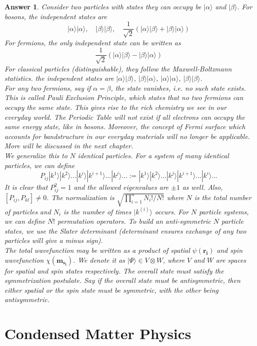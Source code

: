 \documentclass[a4paper]{article}
\newtheorem{ans}{Answer}[section]
\theoremstyle{new}
\begin{document}
\begin{ans}
Consider two particles with states they can occupy be $|\alpha\rangle$ and $|\beta\rangle$. For bosons, the independent states are
$$|\alpha\rangle|\alpha\rangle,\quad|\beta\rangle|\beta\rangle,\quad\frac{1}{\sqrt{2}}(|\alpha\rangle|\beta\rangle+|\beta\rangle|\alpha\rangle)$$
For fermions, the only independent state can be written as
$$\frac{1}{\sqrt{2}}(|\alpha\rangle|\beta\rangle-|\beta\rangle|\alpha\rangle)$$
For classical particles (distinguishable), they follow the Maxwell-Boltzmann statistics. the independent states are $|\alpha\rangle|\beta\rangle$, $|\beta\rangle|\alpha\rangle$, $|\alpha\rangle|\alpha\rangle$, $|\beta\rangle|\beta\rangle$.\\[5pt]
For any two fermions, say if $\alpha=\beta$, the state vanishes, i.e. no such state exists. This is called Pauli Exclusion Principle, which states that no two fermions can occupy the same state. This gives rise to the rich chemistry we see in our everyday world. The Periodic Table will not exist if all electrons can occupy the same energy state, like in bosons. Moreover, the concept of Fermi surface which accounts for bandstructure in our everyday materials will no longer be applicable. More will be discussed in the next chapter.\\[5pt]
We generalize this to $N$ identical particles. For a system of many identical particles, we can define
$$P_{ij}|k^1\rangle|k^2\rangle...|k^i\rangle|k^{i+1}\rangle...|k^j\rangle...:=|k^1\rangle|k^2\rangle...|k^j\rangle|k^{i+1}\rangle...|k^i\rangle...$$
It is clear that $P_{ij}^2=1$ and the allowed eigenvalues are $\pm 1$ as well. Also, $[P_{ij},P_{kl}]\neq 0$. The normalization is $\sqrt{\prod_{i=1}^nN_i!/N!}$ where $N$ is the total number of particles and $N_i$ is the number of times $|k^{(i)}\rangle$ occurs. For $N$ particle systems, we can define $N!$ permutation operators. To build an anti-symmetric $N$ particle states, we use the Slater determinant (determinant ensures exchange of any two particles will give a minus sign).\\[5pt]
The total wavefunction may be written as a product of spatial $\psi(\mathbf{r_i})$ and spin wavefunction $\chi(\mathbf{m_{s_i}})$. We denote it as $|\Psi\rangle\in V\otimes W$, where $V$ and $W$ are spaces for spatial and spin states respectively. The overall state must satisfy the symmetrization postulate. Say if the overall state must be antisymmetric, then either spatial or the spin state must be symmetric, with the other being antisymmetric.
\end{ans}
\newpage
\section{Condensed Matter Physics}
\end{document}
